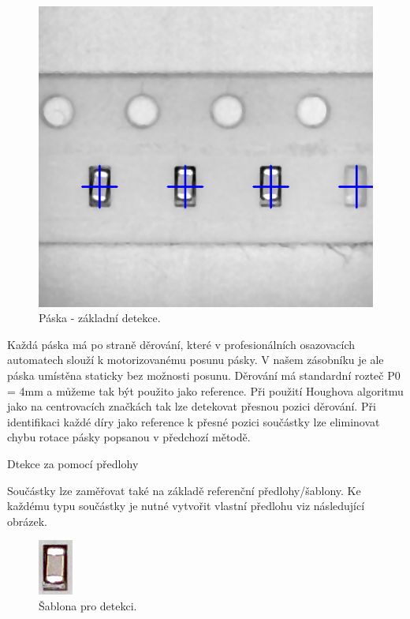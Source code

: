 \begin{figure}[h!]
  \centering
    \includegraphics[width=0.5\linewidth]{obrazky/res1.png}%
    \caption{Páska - základní detekce.}
    \label{fig:tape2}
\end{figure}

Každá páska má po straně děrování, které v profesionálních osazovacích automatech slouží k motorizovanému posunu pásky. V našem zásobníku je ale páska umístěna staticky bez možnosti posunu. Děrování má standardní rozteč P0 = 4mm a můžeme tak být použito jako reference. Při použití Houghova algoritmu jako na centrovacích značkách tak lze detekovat přesnou pozici děrování. Při identifikaci každé díry jako reference k přesné pozici součástky lze eliminovat chybu rotace pásky popsanou v předchozí mětodě.

Dtekce za pomocí předlohy

Součástky lze zaměřovat také na základě referenční předlohy/šablony. Ke každému typu součástky je nutné vytvořit vlastní předlohu viz následující obrázek.

\begin{figure}[h!]
  \centering
    \includegraphics[width=0.1\linewidth]{obrazky/template.png}%
    \caption{Šablona pro detekci.}
    \label{fig:template}
\end{figure}

